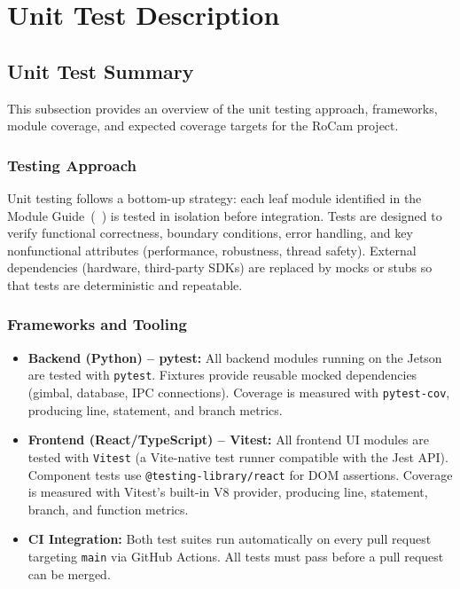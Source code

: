 \documentclass[12pt, titlepage]{article}
\begin{document}
\section{Unit Test Description}

\subsection{Unit Test Summary}

This subsection provides an overview of the unit testing approach, frameworks,
module coverage, and expected coverage targets for the RoCam project.

\subsubsection*{Testing Approach}
Unit testing follows a bottom-up strategy: each leaf module identified in the
Module Guide~(\MG~\cite{MG}) is tested in isolation before integration. Tests
are designed to verify functional correctness, boundary conditions, error
handling, and key nonfunctional attributes (performance, robustness, thread
safety). External dependencies (hardware, third-party SDKs) are replaced by
mocks or stubs so that tests are deterministic and repeatable.

\subsubsection*{Frameworks and Tooling}
\begin{itemize}
  \item \textbf{Backend (Python) -- pytest:}
        All backend modules running on the Jetson are tested with
        \texttt{pytest}. Fixtures provide reusable mocked dependencies
        (gimbal, database, IPC connections). Coverage is measured with
        \texttt{pytest-cov}, producing line, statement, and branch metrics.
  \item \textbf{Frontend (React/TypeScript) -- Vitest:}
        All frontend UI modules are tested with \texttt{Vitest} (a
        Vite-native test runner compatible with the Jest API). Component
        tests use \texttt{@testing-library/react} for DOM assertions.
        Coverage is measured with Vitest's built-in V8 provider, producing
        line, statement, branch, and function metrics.
  \item \textbf{CI Integration:}
        Both test suites run automatically on every pull request targeting
        \texttt{main} via GitHub Actions. All tests must pass before a pull
        request can be merged.
\end{itemize}
\end{document}
